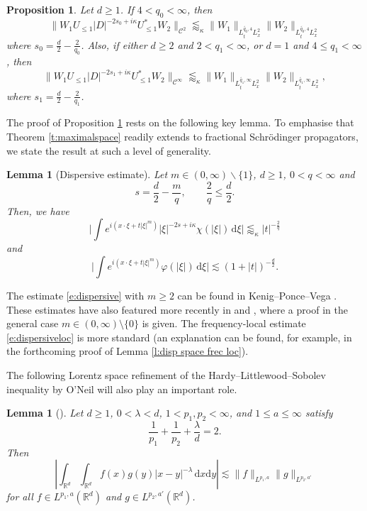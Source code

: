 \documentclass[a4paper]{amsart}
\numberwithin{equation}{section}%
\theoremstyle{plain}%
\newtheorem{lemma}[theorem]{Lemma}
\newtheorem{proposition}[theorem]{Proposition}
\theoremstyle{definition}
\theoremstyle{remark}%
\def\d{\mathrm{d}}
\def\C{\mathcal{C}}
\def\C{\mathcal{C}}
\begin{document}
\begin{proposition}
\label{proposition:UpperHalfC2Cinfty}
Let $d \geq 1$. If $4<q_0<\infty$, then
\begin{equation}\label{i:C2}
\|W_1U_{\leq 1}|D|^{-2s_0+i\kappa}U_{\leq 1}^*W_2\|_{\C^2}
\lessapprox_\kappa 
\|W_1\|_{L_t^{\widetilde{q_0},4}L_x^2}\|W_2\|_{L_t^{\widetilde{q_0},4}L_x^2}
\end{equation}
where $s_0 = \frac{d}{2}- \frac{2}{q_0}$. Also, if either $d \geq 2$ and $2 < q_1 < \infty$, or $d = 1$ and $4 \leq q_1 < \infty$, then
\begin{equation}\label{i:Cinfty}
\|W_1U_{\leq 1}|D|^{-2s_1+i\kappa}U_{\leq 1}^*W_2\|_{\C^\infty}
\lessapprox_\kappa
\|W_1\|_{L_t^{\widetilde{q_1},\infty}L_x^2}\|W_2\|_{L_t^{\widetilde{q_1},\infty}L_x^2},
\end{equation}
where $s_1 = \frac{d}{2}- \frac{2}{q_1}$.
\end{proposition}
The proof of Proposition \ref{proposition:UpperHalfC2Cinfty} rests on the following key lemma. To emphasise that Theorem \ref{t:maximalspace} readily extends to fractional Schr\"odinger propagators, we state the result at such a level of generality. 
\begin{lemma}[Dispersive estimate]\label{l:GLNY}
Let $m\in (0,\infty)\backslash\{1\}$, $d\geq1$, $0<q<\infty$ and 
\[
s=\frac d2-\frac m q,
\qquad
\frac2q\leq \frac d2.
\] 
Then, we have 
\begin{equation}
\label{e:dispersive}
\bigg|
\int e^{i(x \cdot\xi+t|\xi|^m)}|\xi|^{-2s+ i \kappa} \chi(|\xi|)\,\d\xi
\bigg|
\lessapprox_\kappa
|t|^{-\frac2q}
\end{equation}
and
\begin{equation}\label{e:dispersiveloc}
\bigg|
\int e^{i(x \cdot\xi+t|\xi|^m)}\varphi(|\xi|)\,\d\xi
\bigg|
\lesssim
(1+|t|)^{-\frac d2}.
\end{equation}
\end{lemma}

The estimate \eqref{e:dispersive} with $m \geq 2$ can be found in Kenig--Ponce--Vega \cite[Lemma 3.4]{KPV}. These estimates have also featured more recently in \cite{GLNY} and \cite{BLN_Forum}, where a proof in the general case
 $m \in (0,\infty) \setminus \{0\}$ is given. The frequency-local estimate \eqref{e:dispersiveloc} is more standard (an explanation can be found, for example, in the forthcoming proof of Lemma \ref{l:disp space frec loc}).

The following Lorentz space refinement of the Hardy--Littlewood--Sobolev inequality by O'Neil \cite{ONeil} will also play an important role.
\begin{lemma}[\cite{ONeil}]\label{l:ONeil}
Let $d \geq 1$, $0<\lambda<d$, $1<p_1, p_2<\infty$, and $1\leq a \leq\infty$ satisfy
\[
\frac{1}{p_1} +\frac{1}{p_2}+\frac\lambda d=2.
\]
Then
\[
\left|\int_{\mathbb R^d}\int_{\mathbb R^d}f(x)g(y)|x-y|^{-\lambda}\,\d x\d y\right|
\lesssim 
\|f\|_{L^{p_1,a}}\|g\|_{L^{p_2,a'}}
\]
for all $f\in L^{p_1,a}(\mathbb R^d)$ and $g\in L^{p_2,a'}(\mathbb R^d)$.
\end{lemma}
\end{document}
